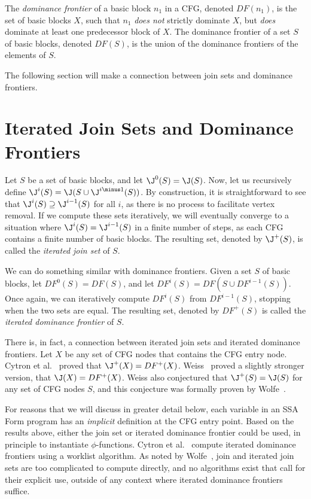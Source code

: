 The \emph{dominance frontier} of a basic block $n_{1}$ in a CFG,
denoted $DF(n_{1})$, is the set of basic blocks $X$, such that
$n_{1}$ \emph{does not} strictly dominate $X$, but \emph{does} 
dominate at least one predecessor block of $X$. The dominance 
frontier of a set $S$ of basic blocks, denoted $DF(S)$, is the union
of the dominance frontiers of the elements of $S$. 

The following section will make a connection between join sets
and dominance frontiers.

\section{Iterated Join Sets and Dominance Frontiers}

Let $S$ be a set of basic blocks, and let $\J^{0}(S) = \J(S)$. 
Now, let us recursively define 
$\J^{i}(S) = \J(S \cup \J^{i \minus 1}(S))$. By
construction, it is straightforward to see that
$\J^{i}(S) \supseteq \J^{i-1}(S)$ for all $i$, as there is
no process to facilitate vertex removal. If we compute these sets
iteratively, we will eventually converge to a situation where
$\J^{i}(S) = \J^{i-1}(S)$ in a finite number of steps, 
as each CFG contains a finite number of basic blocks. The resulting
set, denoted by $\J^{+}(S)$, is called the 
\emph{iterated join set} of $S$. 

We can do something similar with dominance frontiers. Given a set
$S$ of basic blocks, let $DF^{0}(S) = DF(S)$, and let
$DF^{i}(S) = DF(S \cup DF^{i-1}(S))$. Once again, we can iteratively
compute $DF^{i}(S)$ from $DF^{i-1}(S)$, stopping when the two sets
are equal. The resulting set, denoted by $DF^{+}(S)$ is called
the \emph{iterated dominance frontier} of $S$. 

There is, in fact, a connection between iterated join sets and 
iterated dominance frontiers. Let $X$ be any set of CFG nodes
that contains the CFG entry node. Cytron et al.~\cite{CytronOct91}
proved that $\J^{+}(X) = DF^{+}(X)$. Weiss~\cite{WeissJun92}
proved a slightly stronger version, that $\J(X) = DF^{+}(X)$.
Weiss also conjectured that $\J^{+}(S) = \J(S)$ for any 
set of CFG nodes $S$, and this conjecture was formally proven
by Wolfe~\cite{WolfeJul94}. 

For reasons that we will discuss in greater detail below, each
variable in an SSA Form program has an \emph{implicit} definition
at the CFG entry point. Based on the results above, either the
join set or iterated dominance frontier could be used, in principle
to instantiate $\phi$-functions. Cytron et al.~\cite{CytronOct91} 
compute iterated dominance frontiers using a worklist algorithm. 
As noted by Wolfe~\cite{WolfeJul94}, join and iterated join sets 
are too complicated to compute directly, and no algorithms exist
that call for their explicit use, outside of any context where
iterated dominance frontiers suffice.  

